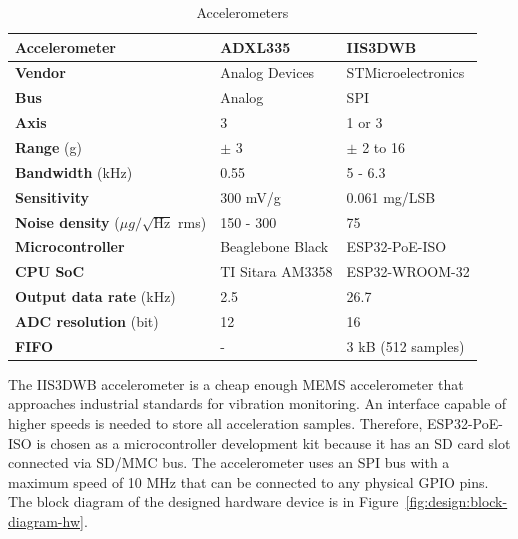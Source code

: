 \begin{table}[ht]
\renewcommand{\arraystretch}{1.2}
\centering
\begin{tabular}{|l|l|l|}
\hline
\textbf{Accelerometer}                           & \textbf{ADXL335} & \textbf{IIS3DWB}   \\ \hline
\textbf{Vendor}                                  & Analog Devices   & STMicroelectronics \\ \hline
\textbf{Bus}                                     & Analog           & SPI                \\ \hline
\textbf{Axis}                                    & 3                & 1 or 3             \\ \hline
\textbf{Range} (g)                               & $\pm$ 3          & $\pm$ 2 to 16      \\ \hline
\textbf{Bandwidth} (kHz)                         & 0.55             & 5 - 6.3            \\ \hline
\textbf{Sensitivity}                             & 300 mV/g         & 0.061 mg/LSB       \\ \hline
\textbf{Noise density} ($\mu g / \sqrt{\mathrm{Hz}}$ rms) & 150 - 300        & 75                 \\ \hline
\textbf{Microcontroller}                         & Beaglebone Black & ESP32-PoE-ISO      \\ \hline
\textbf{CPU SoC}                                 & TI Sitara AM3358 & ESP32-WROOM-32     \\ \hline
\textbf{Output data rate} (kHz)                  & 2.5              & 26.7               \\ \hline
\textbf{ADC resolution} (bit)                    & 12               & 16                 \\ \hline
\textbf{FIFO}                                    & -                & 3 kB (512 samples) \\ \hline
\end{tabular}
\caption{Accelerometers}
\label{tab:design:hw-sensors}
\end{table}

The IIS3DWB accelerometer is a cheap enough MEMS accelerometer that approaches industrial standards for vibration monitoring. An interface capable of higher speeds is needed to store all acceleration samples. Therefore, ESP32-PoE-ISO is chosen as a microcontroller development kit because it has an SD card slot connected via SD/MMC bus. The accelerometer uses an SPI bus with a maximum speed of 10 MHz that can be connected to any physical GPIO pins. The block diagram of the designed hardware device is in Figure~\ref{fig:design:block-diagram-hw}.


